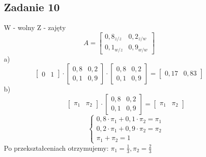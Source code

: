 \subsection{Zadanie 10}

W - wolny
Z - zajęty
$$
A= \left[ 
        \begin{array}{cc}
         0,8_{z/z} & 0,2_{z/w}\\ 
         0,1_{w/z} & 0,9_{w/w}
         \end{array}
      \right] 
      \qquad$$
      a)\\$$
      \left[ 
        \begin{array}{cc}
         0 & 1
         \end{array}
      \right] \cdot
      \left[ 
        \begin{array}{cc}
         0,8 & 0,2\\ 
         0,1 & 0,9
         \end{array}
      \right] 
      \cdot
      \left[ 
        \begin{array}{cc}
         0,8 & 0,2\\ 
         0,1 & 0,9
         \end{array}
      \right] = \left[ 
        \begin{array}{cc}
         0,17 & 0,83
         \end{array}
      \right] 
      \qquad 
      $$
      b)\\
      $$
      \left[ 
        \begin{array}{cc}
         \pi_1 & \pi_2
         \end{array}
      \right] \cdot
      \left[ 
        \begin{array}{cc}
         0,8 & 0,2\\ 
         0,1 & 0,9
         \end{array}
      \right]  = \left[ 
        \begin{array}{cc}
         \pi_1 & \pi_2
         \end{array}
      \right]$$
\begin{equation}
    \left\{\begin{array}{rcl}
                     0,8\cdot\pi_1+ 0,1\cdot\pi_2 = \pi_1\\
                     0,2\cdot\pi_1+ 0,9\cdot\pi_2 = \pi_2\\
                     \pi_1+ \pi_2 = 1
\end{array}\right.
\end{equation}
Po przekształceniach otrzymujemy: $\pi_1 = \frac{1}{3}, \pi_2 = \frac{2}{3}$
